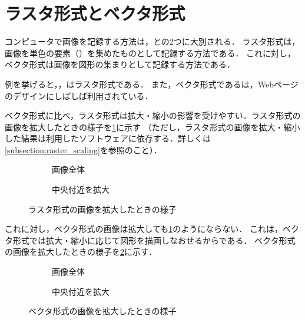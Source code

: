 \documentclass[../../index]{subfiles}
\begin{document}
\section{ラスタ形式とベクタ形式}
コンピュータで画像を記録する方法は，との2つに大別される．
ラスタ形式は，画像を単色の要素（）を集めたものとして記録する方法である．
これに対し，ベクタ形式は画像を図形の集まりとして記録する方法である．

例を挙げると，，はラスタ形式である．
また，ベクタ形式であるは，Webページのデザインにしばしば利用されている．

ベクタ形式に比べ，ラスタ形式は拡大・縮小の影響を受けやすい．ラスタ形式の画像を拡大したときの様子を\cref{figure:raster_scaling}に示す
（ただし，ラスタ形式の画像を拡大・縮小した結果は利用したソフトウェアに依存する．詳しくは\cref{subsection:raster_scaling}を参照のこと）．

\begin{figure}[htb]
  \begin{subfigure}{0.5\linewidth}
    \centering
    \caption{画像全体}
  \end{subfigure}%
  \begin{subfigure}{0.5\linewidth}
    \centering
    \caption{中央付近を拡大}
  \end{subfigure}
  \caption{ラスタ形式の画像を拡大したときの様子}
  \label{figure:raster_scaling}
\end{figure}

これに対し，ベクタ形式の画像は拡大しても\cref{figure:raster_scaling}のようにならない．
これは，ベクタ形式では拡大・縮小に応じて図形を描画しなおせるからである．
ベクタ形式の画像を拡大したときの様子を\cref{figure:vector_scaling}に示す．

\begin{figure}[htb]
  \begin{subfigure}{0.5\linewidth}
    \centering
    \caption{画像全体}
  \end{subfigure}%
  \begin{subfigure}{0.5\linewidth}
    \centering
    \caption{中央付近を拡大}
  \end{subfigure}
  \caption{ベクタ形式の画像を拡大したときの様子}
  \label{figure:vector_scaling}
\end{figure}
\end{document}

